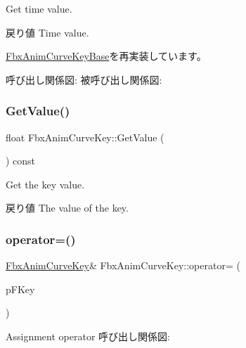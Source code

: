Get time value. \begin{DoxyReturn}{戻り値}
Time value. 
\end{DoxyReturn}


\hyperlink{class_fbx_anim_curve_key_base_a3eebfd7bd2101f759269373a6c9343a2}{Fbx\+Anim\+Curve\+Key\+Base}を再実装しています。

呼び出し関係図\+:
被呼び出し関係図\+:
\mbox{\label{class_fbx_anim_curve_key_a7d66374255e912386ab894a5e2945ff5}} 
\subsubsection{\texorpdfstring{Get\+Value()}{GetValue()}}
{\footnotesize\ttfamily float Fbx\+Anim\+Curve\+Key\+::\+Get\+Value (\begin{DoxyParamCaption}{ }\end{DoxyParamCaption}) const}

Get the key value. \begin{DoxyReturn}{戻り値}
The value of the key. 
\end{DoxyReturn}
\mbox{\label{class_fbx_anim_curve_key_a13c344143cd73f6809edbbb91df08c0e}} 
\subsubsection{\texorpdfstring{operator=()}{operator=()}}
{\footnotesize\ttfamily \hyperlink{class_fbx_anim_curve_key}{Fbx\+Anim\+Curve\+Key}\& Fbx\+Anim\+Curve\+Key\+::operator= (\begin{DoxyParamCaption}\item[{const \hyperlink{class_fbx_anim_curve_key}{Fbx\+Anim\+Curve\+Key} \&}]{p\+F\+Key }\end{DoxyParamCaption})}

Assignment operator 呼び出し関係図\+:
\mbox{\label{class_fbx_anim_curve_key_afdab5f0d38bedc7c4715aaa6a51d4370}} 
